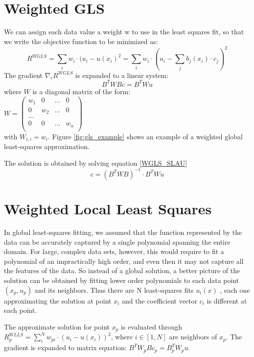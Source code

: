 \section{Weighted GLS}
We can assign each data value a weight w to use in the least squares fit, so that we write the objective function to be minimized as:
\begin{equation}
	R^{WGLS} = \sum_i{w_i \cdot (u_i - u(x_i)^2} = \sum_i{w_i \cdot (u_i - \sum_j{b_j(x_i)\cdot c_j})^2}
\end{equation}
The gradient $\nabla_c R^{WGLS}$ is expanded to a linear system:
\begin{equation}
	B^TWBc = B^TWu
\end{equation}
where $W$ is a diagonal matrix of the form:\\
$W = \begin{pmatrix}
	w_1 & 0 	& ... & 0\\
	0 	& w_2 	& ... & 0\\
	...\\
	0 	& 0 	& ... & w_n\\
\end{pmatrix}$\\
with $W_{i,i} = w_i$. Figure \ref{fig:gls_example} shows an example of a weighted global least-squares approximation.

The solution is obtained by solving equation \ref{WGLS_SLAU}
\begin{equation}
	c = (B^TWB)^{-1}\cdot B^TWu \label{WGLS_SLAU}
\end{equation}
\section{Weighted Local Least Squares}
In global least-squares fitting, we assumed that the function represented by the data can be accurately captured by a single polynomial spanning the entire domain. For large, complex data sets, however, this would require to fit a polynomial of an impractically high order, and even then it may not capture all the features of the data. So instead of a global solution, a better picture of the solution can be obtained by fitting lower order polynomials to each data point $(x_p, u_p)$ and its neighbors. Thus there are N least-squares fits $u_i(x)$ , each one approximating the solution at point $x_i$ and the coefficient vector $c_i$ is different at each point.

The approximate solution for point $x_p$ is evaluated through $R^{WLLS}_p = \sum_i^N w_{pi} \cdot (u_i - u(x_i))^2$, where $i\in [1, N]$ are neighbors of $x_p$. The gradient is expanded to matrix equation: $B^T W_p Bc_p = B_p^T W_p u$.

